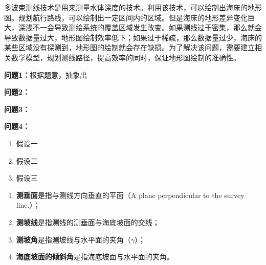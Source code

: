 \setcounter{page}{1}




多波束测线技术是用来测量水体深度的技术。利用该技术，可以绘制出海床的地形图。规划航行路线，可以绘制出一定区间内的区域。但是海床的地形差异变化巨大，深浅不一会导致测绘系统的覆盖区域发生改变。如果测线过于密集，那么就会导致数据量过大，地形图绘制效率低下；如果过于稀疏，那么数据量过少，海床的某些区域没有探测到，地形图的绘制就会存在缺损。为了解决该问题，需要建立相关数学模型，规划测线路径，提高效率的同时，保证地形图绘制的准确性。


\textbf{问题1：}根据题意，抽象出

\textbf{问题2：}

\textbf{问题3：}

\textbf{问题4：}







\begin{enumerate}
    \item 假设一
    \item 假设二
    \item 假设三
\end{enumerate}




\begin{enumerate}
    \item \textbf{测垂面}是指与测线方向垂直的平面（A plane perpendicular to the survey line.）；
    \item \textbf{测坡线}是指测线的测垂面与海底坡面的交线；
    \item \textbf{测坡角}是指测坡线与水平面的夹角（$\gamma$）；
    \item \textbf{海底坡面的倾斜角}是指海底坡面与水平面的夹角。
\end{enumerate}

